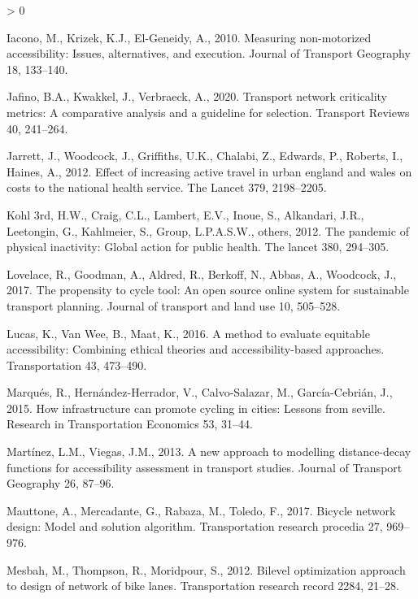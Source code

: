 \documentclass[
]{article}
\newlength{\cslhangindent}
\newenvironment{CSLReferences}[2] %
 {%
  \setlength{\parindent}{0pt}
  \ifodd #1 \everypar{\setlength{\hangindent}{\cslhangindent}}\ignorespaces\fi
  \ifnum #2 > 0
  \setlength{\parskip}{#2\baselineskip}
  \fi
 }%
 {}
\begin{document}
\begin{CSLReferences}{1}{0}
\leavevmode\hypertarget{ref-iacono2010measuring}{}%
Iacono, M., Krizek, K.J., El-Geneidy, A., 2010. Measuring non-motorized accessibility: Issues, alternatives, and execution. Journal of Transport Geography 18, 133--140.

\leavevmode\hypertarget{ref-jafino2020transport}{}%
Jafino, B.A., Kwakkel, J., Verbraeck, A., 2020. Transport network criticality metrics: A comparative analysis and a guideline for selection. Transport Reviews 40, 241--264.

\leavevmode\hypertarget{ref-jarrett2012effect}{}%
Jarrett, J., Woodcock, J., Griffiths, U.K., Chalabi, Z., Edwards, P., Roberts, I., Haines, A., 2012. Effect of increasing active travel in urban england and wales on costs to the national health service. The Lancet 379, 2198--2205.

\leavevmode\hypertarget{ref-kohl2012pandemic}{}%
Kohl 3rd, H.W., Craig, C.L., Lambert, E.V., Inoue, S., Alkandari, J.R., Leetongin, G., Kahlmeier, S., Group, L.P.A.S.W., others, 2012. The pandemic of physical inactivity: Global action for public health. The lancet 380, 294--305.

\leavevmode\hypertarget{ref-lovelace2017propensity}{}%
Lovelace, R., Goodman, A., Aldred, R., Berkoff, N., Abbas, A., Woodcock, J., 2017. The propensity to cycle tool: An open source online system for sustainable transport planning. Journal of transport and land use 10, 505--528.

\leavevmode\hypertarget{ref-lucas2016method}{}%
Lucas, K., Van Wee, B., Maat, K., 2016. A method to evaluate equitable accessibility: Combining ethical theories and accessibility-based approaches. Transportation 43, 473--490.

\leavevmode\hypertarget{ref-marques2015infrastructure}{}%
Marqués, R., Hernández-Herrador, V., Calvo-Salazar, M., García-Cebrián, J., 2015. How infrastructure can promote cycling in cities: Lessons from seville. Research in Transportation Economics 53, 31--44.

\leavevmode\hypertarget{ref-martinez2013new}{}%
Martínez, L.M., Viegas, J.M., 2013. A new approach to modelling distance-decay functions for accessibility assessment in transport studies. Journal of Transport Geography 26, 87--96.

\leavevmode\hypertarget{ref-mauttone2017bicycle}{}%
Mauttone, A., Mercadante, G., Rabaza, M., Toledo, F., 2017. Bicycle network design: Model and solution algorithm. Transportation research procedia 27, 969--976.

\leavevmode\hypertarget{ref-mesbah2012bilevel}{}%
Mesbah, M., Thompson, R., Moridpour, S., 2012. Bilevel optimization approach to design of network of bike lanes. Transportation research record 2284, 21--28.


\end{CSLReferences}
\end{document}
